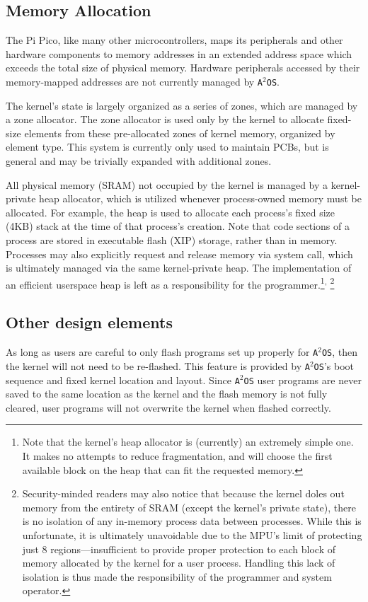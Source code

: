 \documentclass[12pt]{article}
\newcommand\fnsep{\textsuperscript{,}}
\newcommand{\os}{\texttt{A$^2$OS} }
\newcommand{\osns}{\texttt{A$^2$OS}}
\begin{document}
\subsection{Memory Allocation}
The Pi Pico, like many other microcontrollers, maps its peripherals and other
hardware components to memory addresses in an extended address space which
exceeds the total size of physical memory. Hardware peripherals accessed by
their memory-mapped addresses are not currently managed by \osns.

The kernel's state is largely organized as a series of zones, which are managed
by a zone allocator. The zone allocator is used only by the kernel to allocate
fixed-size elements from these pre-allocated zones of kernel memory, organized
by element type. This system is currently only used to maintain PCBs, but is
general and may be trivially expanded with additional zones.

All physical memory (SRAM) not occupied by the kernel is managed by a
kernel-private heap allocator, which is utilized whenever process-owned memory
must be allocated. For example, the heap is used to allocate each process's
fixed size (4KB) stack at the time of that process's creation. Note that code
sections of a process are stored in executable flash (XIP) storage, rather than
in memory. Processes may also explicitly request and release memory via system
call, which is ultimately managed via the same kernel-private heap. The
implementation of an efficient userspace heap is left as a responsibility for
the programmer.\footnote{Note
that the kernel's heap allocator is (currently) an extremely simple one. It
makes no attempts to reduce fragmentation, and will choose the first available
block on the heap that can fit the requested memory.}\fnsep
\footnote{Security-minded readers may also notice that because the kernel doles
out memory from the entirety of SRAM (except the kernel's private state), there
is no isolation of any in-memory process data between processes. While this is
unfortunate, it is ultimately unavoidable due to the MPU's limit of protecting
just 8 regions---insufficient to provide proper protection to each block of
memory allocated by the kernel for a user process. Handling this lack of
isolation is thus made the responsibility of the programmer and system
operator.}

\subsection{Other design elements}
As long as users are careful to only flash programs set up properly for \osns,
then the kernel will not need to be re-flashed. This feature is provided by
\osns's boot sequence and fixed kernel location and layout. Since \os user
programs are never saved to the same location as the kernel and the flash memory
is not fully cleared, user programs will not overwrite the kernel when flashed
correctly.
\end{document}
